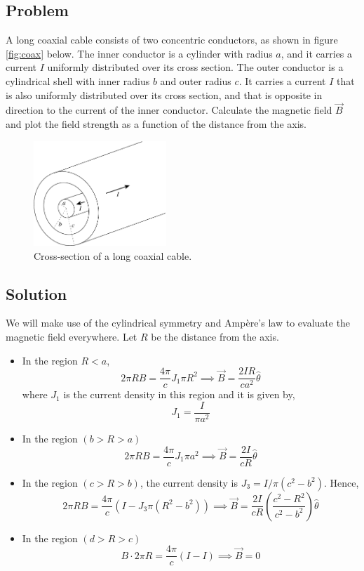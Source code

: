 \documentclass[solutions]{esg8022pset}
\begin{document}
\subsection{Problem}
  A long coaxial cable consists of two concentric conductors, as shown in figure
  \autoref{fig:coax} below.  The inner conductor is a cylinder with radius $a$,
  and it carries a current $I$ uniformly distributed over its cross section.
  The outer conductor is a cylindrical shell with inner radius $b$ and outer
  radius $c$. It carries a current $I$ that is also uniformly distributed over
  its cross section, and that is opposite in direction to the current of the
  inner conductor.  Calculate the magnetic field $\vec{B}$  and plot the field
  strength as a function of the distance from the axis.
  \begin{figure}[H]
    \centering
    \includegraphics[width = 5cm]{coax}
    \caption{Cross-section of a long coaxial cable.}
    \label{fig:coax}
  \end{figure}
\subsection{Solution}
  We will make use of the cylindrical symmetry and Amp\`{e}re's law to evaluate the magnetic field everywhere.
  Let $R$ be the distance from the axis.
  \begin{itemize}
    \item In the region $R<a$,
      $$2\pi R B = \frac{4\pi}{c} J_1\pi R^2 \implies \vec{B} = \frac{2IR}{ca^2}\hat{\theta}$$
      where $J_1$ is the current density in this region and it is given by,
      $$J_{1} = \frac{I}{\pi a^{2}}$$
    \item
      In the region $(b > R > a)$ $$  2\pi R B = \frac{4\pi}{c} J_1\pi a^2
      \implies \vec{B} = \frac{2I}{cR}\hat{\theta}$$
    \item
      In the region $(c > R > b)$, the current density is $J_{3} = I/\pi ( c^2 - b^2 )$. Hence,
      $$2\pi R B = \frac{4\pi}{c} ( I  -
      J_3\pi(R^2-b^2)) \implies \vec{B} =
      \frac{2I}{cR}\left(\frac{c^2 - R^2}{c^2 -b^2}\right)\hat{\theta}$$
    \item
      In the region $(d > R > c)$ $$ B\cdot 2\pi R = \frac{4\pi}{c} ( I - I) \implies \vec{B} = 0 $$
  \end{itemize}
\end{document}
